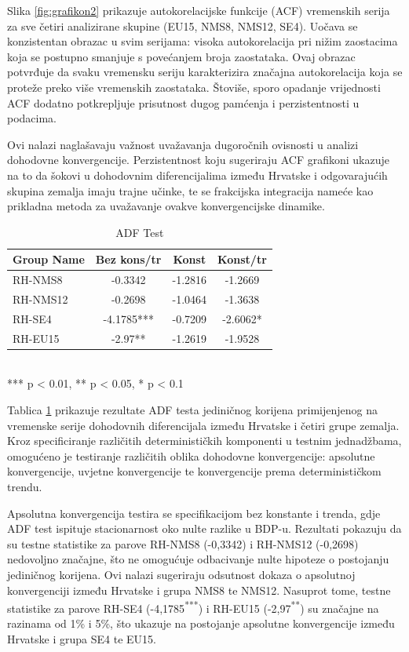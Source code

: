 \documentclass{crebsshr}
\begin{document}
Slika \ref{fig:grafikon2} prikazuje autokorelacijske funkcije (ACF) vremenskih serija za sve četiri analizirane skupine (EU15, NMS8, NMS12, SE4). Uočava se konzistentan obrazac u svim serijama: visoka autokorelacija pri nižim zaostacima koja se postupno smanjuje s povećanjem broja zaostataka. Ovaj obrazac potvrđuje da svaku vremensku seriju karakterizira značajna autokorelacija koja se proteže preko više vremenskih zaostataka. Štoviše, sporo opadanje vrijednosti ACF dodatno potkrepljuje prisutnost dugog pamćenja i perzistentnosti u podacima.

Ovi nalazi naglašavaju važnost uvažavanja dugoročnih ovisnosti u analizi dohodovne konvergencije. Perzistentnost koju sugeriraju ACF grafikoni ukazuje na to da šokovi u dohodovnim diferencijalima između Hrvatske i odgovarajućih skupina zemalja imaju trajne učinke, te se frakcijska integracija nameće kao prikladna metoda za uvažavanje ovakve konvergencijske dinamike.

\begin{table}[ht]
\centering
\caption{ADF Test}
\label{tab:tablica2}
\begin{tabular}{lccc}
\toprule
\textbf{Group Name} & \textbf{Bez kons/tr} & \textbf{Konst} & \textbf{Konst/tr} \\
\midrule
RH-NMS8  & -0.3342 & -1.2816 & -1.2669 \\
RH-NMS12 & -0.2698 & -1.0464 & -1.3638 \\
RH-SE4   & -4.1785*** & -0.7209 & -2.6062* \\
RH-EU15  & -2.97** & -1.2619 & -1.9528 \\
\bottomrule
\end{tabular}
\\
\footnotesize{*** p < 0.01, ** p < 0.05, * p < 0.1}
\end{table}

Tablica \ref{tab:tablica2} prikazuje rezultate ADF testa jediničnog korijena primijenjenog na vremenske serije dohodovnih diferencijala između Hrvatske i četiri grupe zemalja. Kroz specificiranje različitih determinističkih komponenti u testnim jednadžbama, omogućeno je testiranje različitih oblika dohodovne konvergencije: apsolutne konvergencije, uvjetne konvergencije te konvergencije prema determinističkom trendu.

Apsolutna konvergencija testira se specifikacijom bez konstante i trenda, gdje ADF test ispituje stacionarnost oko nulte razlike u BDP-u. Rezultati pokazuju da su testne statistike za parove RH-NMS8 (-0,3342) i RH-NMS12 (-0,2698) nedovoljno značajne, što ne omogućuje odbacivanje nulte hipoteze o postojanju jediničnog korijena. Ovi nalazi sugeriraju odsutnost dokaza o apsolutnoj konvergenciji između Hrvatske i grupa NMS8 te NMS12. Nasuprot tome, testne statistike za parove RH-SE4 (-4,1785\textsuperscript{***}) i RH-EU15 (-2,97\textsuperscript{**}) su značajne na razinama od 1\% i 5\%, što ukazuje na postojanje apsolutne konvergencije između Hrvatske i grupa SE4 te EU15.
\end{document}
